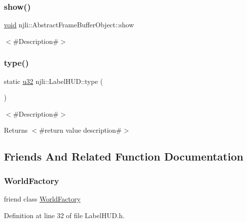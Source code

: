 \subsubsection{\texorpdfstring{show()}{show()}}
{\footnotesize\ttfamily \mbox{\hyperlink{_thread_8h_af1e856da2e658414cb2456cb6f7ebc66}{void}} njli\+::\+Abstract\+Frame\+Buffer\+Object\+::show}

$<$\#\+Description\#$>$ \mbox{\label{classnjli_1_1_label_h_u_d_af0e2d204e906dff5fac5e5f744477f35}} 
\subsubsection{\texorpdfstring{type()}{type()}}
{\footnotesize\ttfamily static \mbox{\hyperlink{_util_8h_a10e94b422ef0c20dcdec20d31a1f5049}{u32}} njli\+::\+Label\+H\+U\+D\+::type (\begin{DoxyParamCaption}{ }\end{DoxyParamCaption})\hspace{0.3cm}{\ttfamily [static]}}

$<$\#\+Description\#$>$

\begin{DoxyReturn}{Returns}
$<$\#return value description\#$>$ 
\end{DoxyReturn}


\subsection{Friends And Related Function Documentation}
\mbox{\label{classnjli_1_1_label_h_u_d_acb96ebb09abe8f2a37a915a842babfac}} 
\subsubsection{\texorpdfstring{World\+Factory}{WorldFactory}}
{\footnotesize\ttfamily friend class \mbox{\hyperlink{classnjli_1_1_world_factory}{World\+Factory}}\hspace{0.3cm}{\ttfamily [friend]}}



Definition at line 32 of file Label\+H\+U\+D.\+h.



